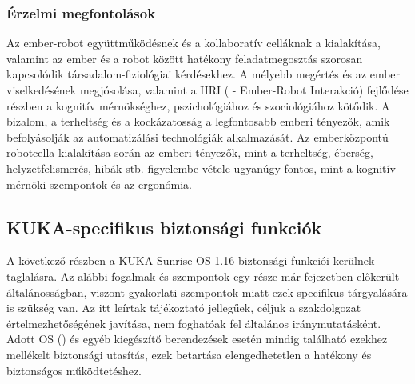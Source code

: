 \documentclass[../documentation.tex]{subfiles}
\begin{document}
\subsubsection{Érzelmi megfontolások}
Az ember-robot együttműködésnek és a kollaboratív celláknak a kialakítása, valamint az ember és a robot között hatékony feladatmegosztás szorosan kapcsolódik társadalom-fiziológiai kérdésekhez. A mélyebb megértés és az ember viselkedésének megjósolása, valamint a HRI ( - Ember-Robot Interakció) fejlődése részben a kognitív mérnökséghez, pszichológiához és szociológiához kötődik. A bizalom, a terheltség és a kockázatosság a legfontosabb emberi tényezők, amik befolyásolják az automatizálási technológiák alkalmazását. Az emberközpontú robotcella kialakítása során az emberi tényezők, mint a terheltség, éberség, helyzetfelismerés, hibák stb. figyelembe vétele ugyanúgy fontos, mint a kognitív mérnöki szempontok és az ergonómia\cite{humanfactors}.

\subsection{KUKA-specifikus biztonsági funkciók}
A következő részben a KUKA Sunrise OS 1.16\cite{sunrisemanual} biztonsági funkciói kerülnek taglalásra. Az alábbi fogalmak és szempontok egy része már  fejezetben előkerült általánosságban, viszont gyakorlati szempontok miatt ezek specifikus tárgyalására is szükség van. Az itt leírtak tájékoztató jellegűek, céljuk a szakdolgozat értelmezhetőségének javítása, nem foghatóak fel általános iránymutatásként. Adott OS () és egyéb kiegészítő berendezések esetén mindig található ezekhez mellékelt biztonsági utasítás, ezek betartása elengedhetetlen a hatékony és biztonságos működtetéshez.
\end{document}
